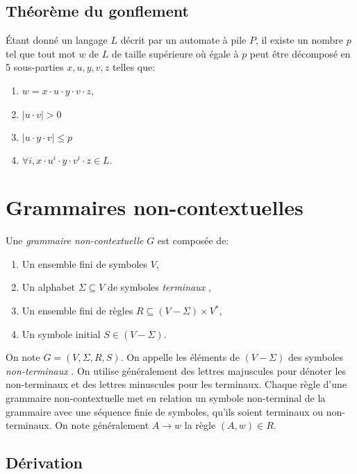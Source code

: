 \subsection{Théorème du gonflement}

Étant donné un langage $L$ décrit par un automate à pile $P$, il existe un nombre $p$ tel que tout mot $w$ de $L$ de taille supérieure où égale à $p$ peut être décomposé en 5 sous-parties $x, u, y, v, z$ telles que:
\begin{enumerate}
\item $w = x \cdot u \cdot y \cdot v \cdot z$,
\item $|u \cdot v| > 0$
\item $|u \cdot y \cdot v| \leq p$
\item $\forall i, x \cdot u^i \cdot y \cdot v^i \cdot z \in L$. 
\end{enumerate}

\section{Grammaires non-contextuelles}

Une \og \textit{grammaire non-contextuelle} \fg{} $G$ est composée de:
\begin{enumerate}
\item Un ensemble fini de symboles $V$,
\item Un alphabet $\Sigma \subseteq V$ de symboles \og \textit{terminaux} \fg{},
\item Un ensemble fini de règles $R \subseteq (V - \Sigma) \times V^*$,
\item Un symbole initial $S \in (V - \Sigma)$.
\end{enumerate}
On note $G = (V, \Sigma, R, S)$.
On appelle les éléments de $(V - \Sigma)$ des symboles \og \textit{non-terminaux} \fg{}.
On utilise généralement des lettres majuscules pour dénoter les non-terminaux et des lettres minuscules pour les terminaux.
Chaque règle d'une grammaire non-contextuelle met en relation un symbole non-terminal de la grammaire avec une séquence finie de symboles, qu'ils soient terminaux ou non-terminaux. On note généralement $A \to w$ la règle $(A, w) \in R$.

\subsection{Dérivation}


